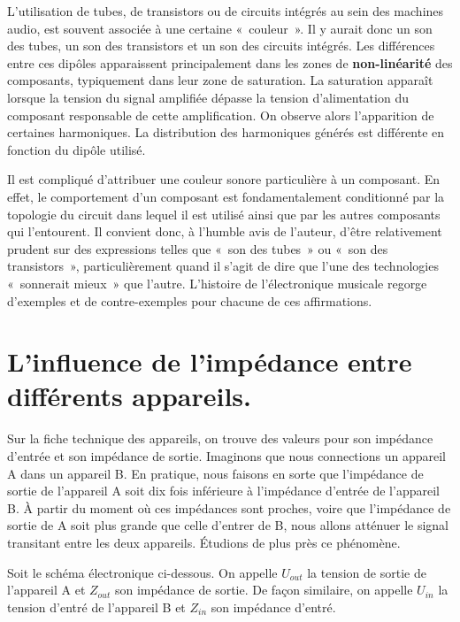 \documentclass[
]{book}
\begin{document}
L'utilisation de tubes, de transistors ou de circuits intégrés au sein des machines audio, est souvent associée à une certaine «~couleur~». Il y aurait donc un son des tubes, un son des transistors et un son des circuits intégrés. Les différences entre ces dipôles apparaissent principalement dans les zones de \textbf{non-linéarité} des composants, typiquement dans leur zone de saturation. La saturation apparaît lorsque la tension du signal amplifiée dépasse la tension d'alimentation du composant responsable de cette amplification. On observe alors l'apparition de certaines harmoniques. La distribution des harmoniques générés est différente en fonction du dipôle utilisé.

Il est compliqué d'attribuer une couleur sonore particulière à un composant. En effet, le comportement d'un composant est fondamentalement conditionné par la topologie du circuit dans lequel il est utilisé ainsi que par les autres composants qui l'entourent. Il convient donc, à l'humble avis de l'auteur, d'être relativement prudent sur des expressions telles que «~son des tubes~» ou «~son des transistors~», particulièrement quand il s'agit de dire que l'une des technologies «~sonnerait mieux~» que l'autre. L'histoire de l'électronique musicale regorge d'exemples et de contre-exemples pour chacune de ces affirmations.

\hypertarget{linfluence-de-limpuxe9dance-entre-diffuxe9rents-appareils.}{%
\section{L'influence de l'impédance entre différents appareils.}\label{linfluence-de-limpuxe9dance-entre-diffuxe9rents-appareils.}}

Sur la fiche technique des appareils, on trouve des valeurs pour son impédance d'entrée et son impédance de sortie. Imaginons que nous connections un appareil A dans un appareil B. En pratique, nous faisons en sorte que l'impédance de sortie de l'appareil A soit dix fois inférieure à l'impédance d'entrée de l'appareil B. À partir du moment où ces impédances sont proches, voire que l'impédance de sortie de A soit plus grande que celle d'entrer de B, nous allons atténuer le signal transitant entre les deux appareils. Étudions de plus près ce phénomène.

Soit le schéma électronique ci-dessous. On appelle \(U_{out}\) la tension de sortie de l'appareil A et \(Z_{out}\) son impédance de sortie. De façon similaire, on appelle \(U_{in}\) la tension d'entré de l'appareil B et \(Z_{in}\) son impédance d'entré.
\end{document}
